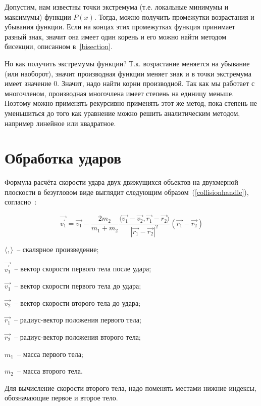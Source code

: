 Допустим, нам известны точки экстремума (т.е. локальные минимумы и максимумы) функции \(P(x)\).
Тогда, можно получить промежутки возрастания и убывания функции.
Если на концах этих промежутках функция принимает разный знак,
значит она имеет один корень и его можно найти методом бисекции, описанном в~\ref{bisection}.

Но как получить экстремумы функции? Т.к. возрастание меняется на убывание (или наоборот),
значит производная функции меняет знак и в точки экстремума имеет значение \(0\).
Значит, надо найти корни производной. Так как мы работает с многочленом, производная многочлена
имеет степень на единицу меньше. Поэтому можно применять рекурсивно применять этот же метод,
пока степень не уменьшиться до того как уравнение можно решить аналитическим методом,
например линейное или квадратное.

\section{Обработка ударов}

Формула расчёта скорости удара двух движущихся объектов на двухмерной плоскости в безугловом виде
выглядит следующим образом~(\ref{collisionhandle}), согласно~\cite{wiki-ellastic-collision}:

\begin{equation}\label{collisionhandle}
  \vec{v_1^\prime} = \vec{v_1} - \frac{2 m_2}{m_1 + m_2}
  \frac{\langle \vec{v_1} - \vec{v_2}, \vec{r_1} - \vec{r_2} \rangle }{\left| \vec{r_1} - \vec{r_2} \right|^2}
  (\vec{r_1} - \vec{r_2})
\end{equation}

\begin{Underequation}
  \(\langle , \rangle\)~-- скалярное произведение;

  \(\vec{v_1^\prime}\)~-- вектор скорости первого тела после удара;

  \(\vec{v_1}\)~-- вектор скорости первого тела до удара;

  \(\vec{v_2}\)~-- вектор скорости второго тела до удара;

  \(\vec{r_1}\)~-- радиус-вектор положения первого тела;

  \(\vec{r_2}\)~-- радиус-вектор положения второго тела;

  \(m_1\)~-- масса первого тела;

  \(m_2\)~-- масса второго тела.
\end{Underequation}

Для вычисление скорости второго тела, надо поменять местами нижние индексы, обозначающие первое и второе тело.


